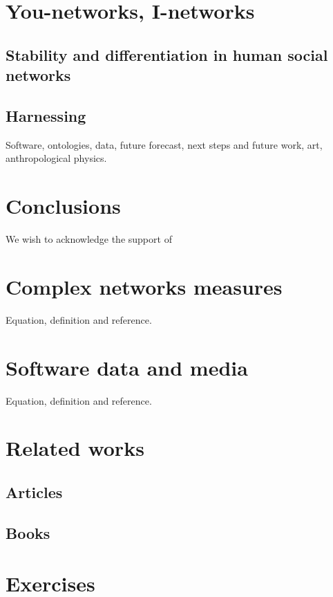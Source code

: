 \documentclass[%
 aip,
 jmp,%
 amsmath,amssymb,
 reprint,%
]{revtex4-1}
\begin{document}
\section{\label{sec:inet}You-networks, I-networks}
\subsection{\label{sec:stabdiff}Stability and differentiation in human social networks}
\subsection{\label{sec:harn}Harnessing}
Software, ontologies, data, future forecast, next steps 
and future work, art, anthropological physics.

\section{\label{sec:conc}Conclusions}

\begin{acknowledgments}
We wish to acknowledge the support of 
\end{acknowledgments}

\appendix

\section{Complex networks measures}
Equation, definition and reference.

\section{Software data and media}
Equation, definition and reference.
\section{Related works}
\subsection{Articles}
\subsection{Books}
\section{Exercises}


\nocite{*}
\end{document}
